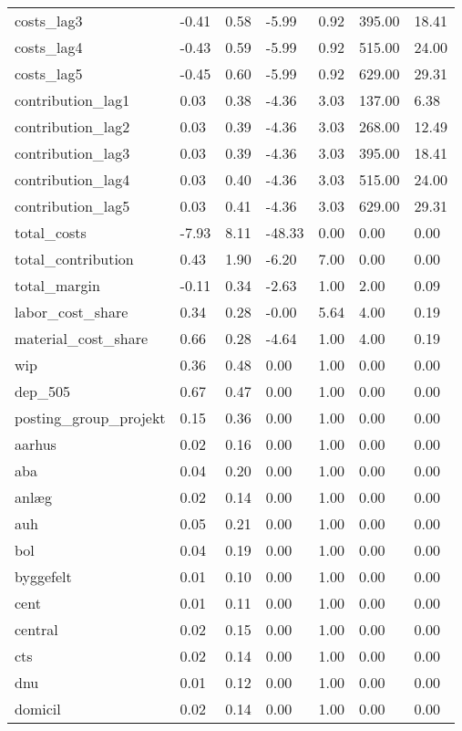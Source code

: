 \begin{landscape}
\begin{longtable}[h!]{lllllll}
costs_lag3 & -0.41 & 0.58 & -5.99 & 0.92 & 395.00 & 18.41 \\
costs_lag4 & -0.43 & 0.59 & -5.99 & 0.92 & 515.00 & 24.00 \\
costs_lag5 & -0.45 & 0.60 & -5.99 & 0.92 & 629.00 & 29.31 \\
contribution_lag1 & 0.03 & 0.38 & -4.36 & 3.03 & 137.00 & 6.38 \\
contribution_lag2 & 0.03 & 0.39 & -4.36 & 3.03 & 268.00 & 12.49 \\
contribution_lag3 & 0.03 & 0.39 & -4.36 & 3.03 & 395.00 & 18.41 \\
contribution_lag4 & 0.03 & 0.40 & -4.36 & 3.03 & 515.00 & 24.00 \\
contribution_lag5 & 0.03 & 0.41 & -4.36 & 3.03 & 629.00 & 29.31 \\
total_costs & -7.93 & 8.11 & -48.33 & 0.00 & 0.00 & 0.00 \\
total_contribution & 0.43 & 1.90 & -6.20 & 7.00 & 0.00 & 0.00 \\
total_margin & -0.11 & 0.34 & -2.63 & 1.00 & 2.00 & 0.09 \\
labor_cost_share & 0.34 & 0.28 & -0.00 & 5.64 & 4.00 & 0.19 \\
material_cost_share & 0.66 & 0.28 & -4.64 & 1.00 & 4.00 & 0.19 \\
wip & 0.36 & 0.48 & 0.00 & 1.00 & 0.00 & 0.00 \\
dep_505 & 0.67 & 0.47 & 0.00 & 1.00 & 0.00 & 0.00 \\
posting_group_projekt & 0.15 & 0.36 & 0.00 & 1.00 & 0.00 & 0.00 \\
aarhus & 0.02 & 0.16 & 0.00 & 1.00 & 0.00 & 0.00 \\
aba & 0.04 & 0.20 & 0.00 & 1.00 & 0.00 & 0.00 \\
anlæg & 0.02 & 0.14 & 0.00 & 1.00 & 0.00 & 0.00 \\
auh & 0.05 & 0.21 & 0.00 & 1.00 & 0.00 & 0.00 \\
bol & 0.04 & 0.19 & 0.00 & 1.00 & 0.00 & 0.00 \\
byggefelt & 0.01 & 0.10 & 0.00 & 1.00 & 0.00 & 0.00 \\
cent & 0.01 & 0.11 & 0.00 & 1.00 & 0.00 & 0.00 \\
central & 0.02 & 0.15 & 0.00 & 1.00 & 0.00 & 0.00 \\
cts & 0.02 & 0.14 & 0.00 & 1.00 & 0.00 & 0.00 \\
dnu & 0.01 & 0.12 & 0.00 & 1.00 & 0.00 & 0.00 \\
domicil & 0.02 & 0.14 & 0.00 & 1.00 & 0.00 & 0.00 \\

\end{longtable}
\end{landscape}
